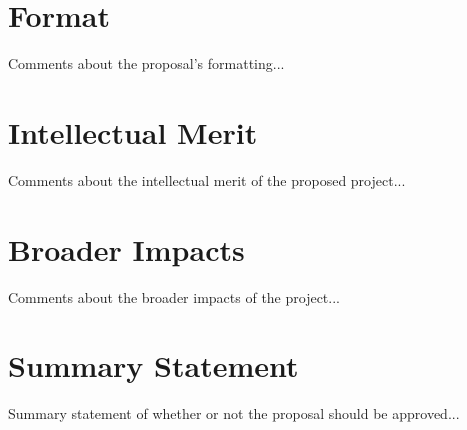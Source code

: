 \documentclass{proposalreview}
\begin{document}
\makeinfo{}

\section{Format}
Comments about the proposal's formatting...

\section{Intellectual Merit}
Comments about the intellectual merit of the proposed project...

\section{Broader Impacts}
Comments about the broader impacts of the project...

\section{Summary Statement}
Summary statement of whether or not the proposal should be approved...
\end{document}
